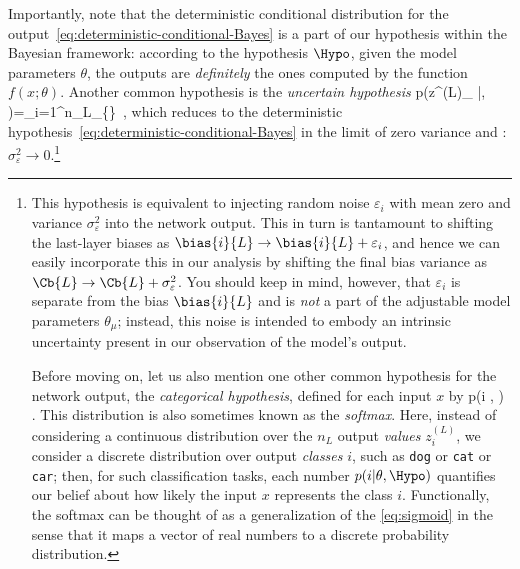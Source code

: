 Importantly, note that the deterministic conditional distribution for the output~\eqref{eq:deterministic-conditional-Bayes} is a part of our hypothesis within the Bayesian framework: according to the hypothesis $\Hypo$, given the model parameters $\theta$, the outputs are \emph{definitely} the ones computed by the function $f(x;\theta)$.
Another common hypothesis is the
\emph{uncertain hypothesis}
\be\label{eq:noisy-conditional-Bayes}
p\!\le(z^{(L)}_{\D} \Big|\theta, \Hypo \ri)=\prod_{i=1}^{n_{L}}\prod_{\delta\in\D}\le\{\exp\!\ri\}\, ,
\ee
which reduces to the deterministic hypothesis~\eqref{eq:deterministic-conditional-Bayes} in the
limit of zero variance and : $\sigma_{\varepsilon}^2\rightarrow 0$.\footnote{
This hypothesis is equivalent to injecting random noise $\varepsilon_i$ with mean zero and variance $\sigma_{\varepsilon}^2$ into the network output.
This in turn is tantamount to shifting the last-layer biases as $\bias{i}{L}\to\bias{i}{L}+\varepsilon_i$, and hence we can easily incorporate this in our analysis by shifting the final bias variance as $\Cb{L}\to\Cb{L}+\sigma_{\varepsilon}^2$.
You should keep in mind, however, that $\varepsilon_i$ is separate from the bias $\bias{i}{L}$ and is \emph{not} a part of the adjustable model parameters $\theta_{\mu}$; instead, this noise is intended to embody an intrinsic uncertainty present in our observation of the model's output.

Before moving on, let us also mention one other common 
hypothesis for the network output, the \emph{categorical hypothesis}, defined for each input $x$ by
\be\label{eq:softmax}
p(i \vert\theta, \Hypo)\equiv {}\, .
\ee
This distribution is also sometimes known as the \emph{softmax}.
Here, instead of considering a continuous distribution over the $n_{L}$ output \emph{values} $z_i^{(L)}$, we consider a discrete distribution over output \emph{classes} $i$, such as \texttt{dog} or \texttt{cat} or \texttt{car};
then, for such classification tasks, each number $p(i \vert\theta, \Hypo)$ quantifies our belief about how likely the input $x$ represents the class $i$. Functionally, the softmax can be thought of as a generalization of the  \eqref{eq:sigmoid} in the sense that it maps a vector of real numbers to 
a discrete probability distribution.
}
